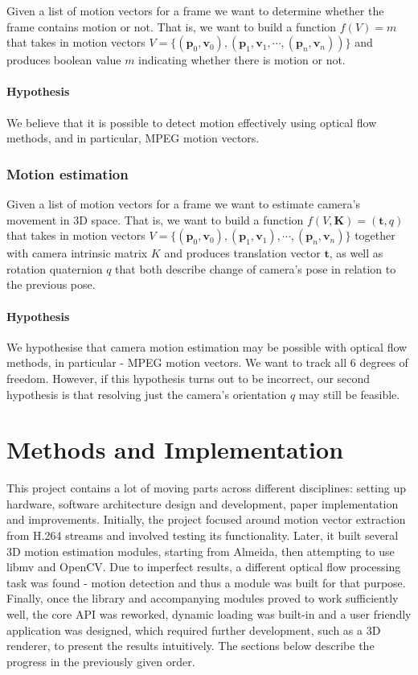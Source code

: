 \documentclass[11pt,english]{report}
\begin{document}
Given a list of motion vectors for a frame we want to determine whether the frame contains motion or not. That is, we want to build a function $f(V) = m$ that takes in motion vectors $V = \{(\mathbf{p}_0, \mathbf{v}_0), (\mathbf{p}_1, \mathbf{v}_1, \cdots, (\mathbf{p}_n, \mathbf{v}_n))\}$ and produces boolean value $m$ indicating whether there is motion or not.

\subsubsection{Hypothesis}

We believe that it is possible to detect motion effectively using optical flow methods, and in particular, MPEG motion vectors.

\subsection{Motion estimation}

Given a list of motion vectors for a frame we want to estimate camera's movement in 3D space. That is, we want to build a function $f(V, \mathbf{K}) = (\mathbf{t}, q)$ that takes in motion vectors $V = \{(\mathbf{p}_0, \mathbf{v}_0), (\mathbf{p}_1, \mathbf{v}_1), \cdots, (\mathbf{p}_n, \mathbf{v}_n)\}$ together with camera intrinsic matrix $K$ and produces translation vector $\mathbf{t}$, as well as rotation quaternion $q$ that both describe change of camera's pose in relation to the previous pose.

\subsubsection{Hypothesis}

We hypothesise that camera motion estimation may be possible with optical flow methods, in particular - MPEG motion vectors. We want to track all 6 degrees of freedom. However, if this hypothesis turns out to be incorrect, our second hypothesis is that resolving just the camera's orientation $q$ may still be feasible.

\chapter{Methods and Implementation}

This project contains a lot of moving parts across different disciplines: setting up hardware, software architecture design and development, paper implementation and improvements. Initially, the project focused around motion vector extraction from H.264 streams and involved testing its functionality. Later, it built several 3D motion estimation modules, starting from Almeida, then attempting to use libmv and OpenCV. Due to imperfect results, a different optical flow processing task was found - motion detection and thus a module was built for that purpose. Finally, once the library and accompanying modules proved to work sufficiently well, the core API was reworked, dynamic loading was built-in and a user friendly application was designed, which required further development, such as a 3D renderer, to present the results intuitively. The sections below describe the progress in the previously given order.
\end{document}
